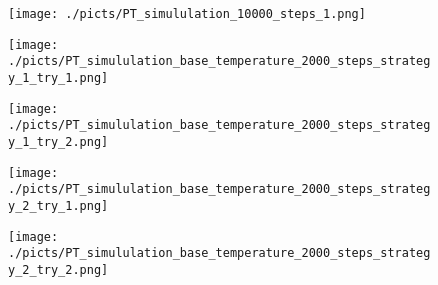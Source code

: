 \begin{frame}[plain]

	\begin{center}
		\begin{figure}\texttt{[image: ./picts/PT\_simululation\_10000\_steps\_1.png]}\end{figure}	
	\end{center}	
		
\end{frame}





\begin{frame}[plain]

	\begin{center}
		\begin{figure}\texttt{[image: ./picts/PT\_simululation\_base\_temperature\_2000\_steps\_strategy\_1\_try\_1.png]}\end{figure}	
	\end{center}	
		
\end{frame}

\begin{frame}[plain]

	\begin{center}
		\begin{figure}\texttt{[image: ./picts/PT\_simululation\_base\_temperature\_2000\_steps\_strategy\_1\_try\_2.png]}\end{figure}	
	\end{center}	
		
\end{frame}


\begin{frame}[plain]

	\begin{center}
		\begin{figure}\texttt{[image: ./picts/PT\_simululation\_base\_temperature\_2000\_steps\_strategy\_2\_try\_1.png]}\end{figure}	
	\end{center}	
		
\end{frame}

\begin{frame}[plain]

	\begin{center}
		\begin{figure}\texttt{[image: ./picts/PT\_simululation\_base\_temperature\_2000\_steps\_strategy\_2\_try\_2.png]}\end{figure}	
	\end{center}	
		
\end{frame}

